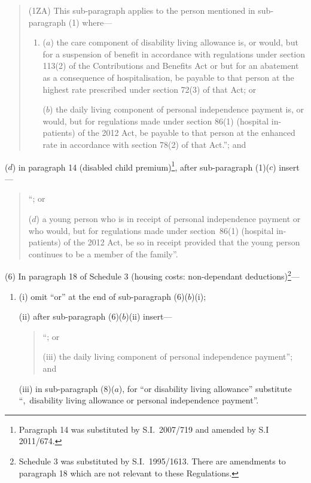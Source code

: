 \documentclass[12pt,a4paper]{article}
\begin{document}
\begin{enumerate}
\begin{enumerate}
\begin{quotation}
(1ZA) This sub-paragraph applies to the person mentioned in sub-paragraph (1) where—
\begin{enumerate}\item[]
($a$) the care component of disability living allowance is, or would, but for a suspension of benefit in accordance with regulations under section 113(2) of the Contributions and Benefits Act or but for an abatement as a consequence of hospitalisation, be payable to that person at the highest rate prescribed under section 72(3) of that Act; or

($b$) the daily living component of personal independence payment is, or would, but for regulations made under section 86(1) (hospital in-patients) of the 2012 Act, be payable to that person at the enhanced rate in accordance with section 78(2) of that Act.”; and
\end{enumerate}
\end{quotation}
\end{enumerate}

($d$) in paragraph 14 (disabled child premium)\footnote{Paragraph 14 was substituted by S.I.~2007/719 and amended by S.I 2011/674.}, after sub-paragraph (1)($c$)  insert—
\begin{quotation}
“; or

($d$) a young person who is in receipt of personal independence payment or who would, but for regulations made under section~86(1) (hospital in-patients) of the 2012 Act, be so in receipt provided that the young person continues to be a member of the family”.
\end{quotation}
\end{enumerate}

(6) In paragraph 18 of Schedule 3 (housing costs: non-dependant deductions)\footnote{Schedule 3 was substituted by S.I.~1995/1613. There are amendments to paragraph 18 which are not relevant to these Regulations.}—
\begin{enumerate}\item[]
(i) omit “or” at the end of sub-paragraph (6)($b$)(i);

(ii) after sub-paragraph (6)($b$)(ii)  insert—
\begin{quotation}
“; or

(iii) the daily living component of personal independence payment”; and
\end{quotation}

(iii) in sub-paragraph (8)($a$), for “or disability living allowance” substitute “,~disability living allowance or personal independence payment”.
\end{enumerate}
\end{document}

